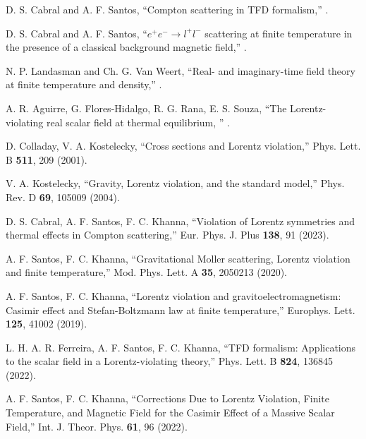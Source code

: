 \documentclass[11pt,showpacs,preprintnumbers,amsmath,amssymb,prd,nofootinbib,superscriptaddress]{revtex4-2}
\begin{document}
\begin{thebibliography}{99}
 D. S. Cabral and A. F. Santos, ``Compton scattering in TFD formalism,'' .

 D. S. Cabral and A. F. Santos, ``$e^{+}e^{-}\to l^{+}l^{-}$  scattering at finite temperature in the presence of a classical background magnetic field,'' .

 N. P. Landasman and Ch. G. Van Weert, ``Real- and imaginary-time field theory at finite temperature and density,'' .

 A. R. Aguirre, G. Flores-Hidalgo, R. G. Rana, E. S. Souza, ``The Lorentz-violating real scalar field at thermal equilibrium, '' .


 D. Colladay, V. A. Kostelecky, ``Cross sections and Lorentz violation,''  {Phys. Lett. B \textbf{511}, 209 (2001)}.

 V. A. Kostelecky, ``Gravity, Lorentz violation, and the standard model,''  {Phys. Rev. D \textbf{69}, 105009 (2004)}.

 D. S. Cabral, A. F. Santos, F. C. Khanna, ``Violation of Lorentz symmetries and thermal effects in Compton scattering,''  {Eur. Phys. J. Plus \textbf{138}, 91 (2023)}.

 A. F. Santos, F. C. Khanna, ``Gravitational Moller scattering, Lorentz violation and finite temperature,''  {Mod. Phys. Lett. A \textbf{35}, 2050213 (2020)}.

 A. F. Santos, F. C. Khanna, ``Lorentz violation and gravitoelectromagnetism: Casimir effect and Stefan-Boltzmann law at finite temperature,''  {Europhys. Lett. \textbf{125}, 41002 (2019)}.

 L. H. A. R. Ferreira, A. F. Santos, F. C. Khanna, ``TFD formalism: Applications to the scalar field in a Lorentz-violating theory,''  {Phys. Lett. B \textbf{824}, 136845 (2022)}.

 A. F. Santos, F. C. Khanna, ``Corrections Due to Lorentz Violation, Finite Temperature, and Magnetic Field for the Casimir Effect of a Massive Scalar Field,''  {Int. J. Theor. Phys. \textbf{61}, 96 (2022)}.


\end{thebibliography}
\end{document}

